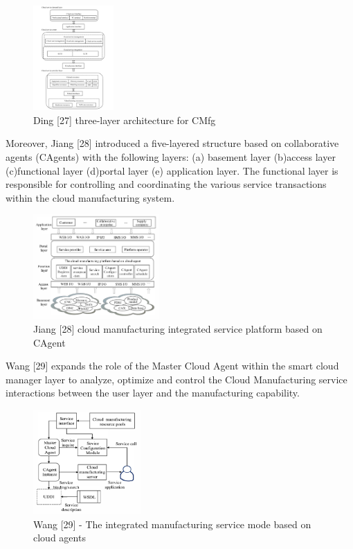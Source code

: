 \begin{figure}[h]
    \centering
    \includegraphics[height=4cm, keepaspectratio]{images/ding-three-layer-architecture}
    \caption{Ding [27] three-layer architecture for CMfg}
    \label{fig:ding-3-layer-architecture}
\end{figure}

Moreover, Jiang [28] introduced a five-layered structure based on collaborative agents (CAgents) with the following layers: (a) basement layer (b)access layer (c)functional layer (d)portal layer (e) application layer. The functional layer is responsible for controlling and coordinating the various service transactions within the cloud manufacturing system.

\begin{figure}[h]
    \centering
    \includegraphics[height=4cm, keepaspectratio]{images/jiang-cloud-mfg}
    \caption{Jiang [28] cloud manufacturing integrated service platform based on CAgent}
    \label{fig:jiang-architecture}
\end{figure}

Wang [29] expands the role of the Master Cloud Agent within the smart cloud manager layer to analyze, optimize and control the Cloud Manufacturing service interactions between the user layer and the manufacturing capability.

\begin{figure}[h]
    \centering
    \includegraphics[height=4cm, keepaspectratio]{images/wang-integrated-mfg-services}
    \caption{Wang [29] - The integrated manufacturing service mode based on cloud agents}
    \label{fig:ding-3-layer-architecture}
\end{figure}

